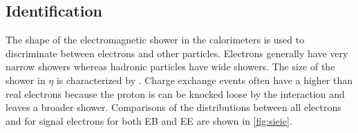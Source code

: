 \subsection{Identification}

The shape of the electromagnetic shower in the calorimeters is used to
discriminate between electrons and other particles. Electrons generally have
very narrow showers whereas hadronic particles have wide showers. The size of
the shower in $\eta$ is characterized by \sigmaietaieta. Charge exchange events
often have a higher \sigmaietaieta than real electrons because the proton is
can be knocked loose by the interaction and leaves a broader shower.
Comparisons of the \sigmaietaieta distributions between all electrons and for
signal electrons for both EB and EE are shown in \cref{fig:sieie}.

